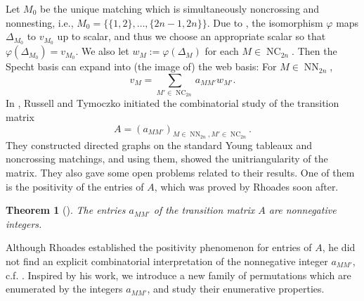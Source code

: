 \documentclass[reqno,12pt]{amsart}
\newtheorem{thm}{Theorem}[section]
\theoremstyle{definition}
\theoremstyle{remark}
\newcommand\NC{\operatorname{NC}}
\newcommand\NN{\operatorname{NN}}
\begin{document}
Let \( M_0 \) be the unique matching which is simultaneously noncrossing and
nonnesting, i.e., \( M_0 = \{ \{1,2\},\dots,\{2n-1,2n\} \} \).
Due to \cite{RT19}, the isomorphism \( \varphi \) maps \( \Delta_{M_0} \)
to \( v_{M_0} \) up to scalar, and thus we choose an appropriate scalar so that
\( \varphi(\Delta_{M_0}) = v_{M_0} \).
We also let \( w_M := \varphi(\Delta_M) \) for each \( M\in\NC_{2n} \).
Then the Specht basis can expand into (the image of) the web basis:
For \( M\in\NN_{2n} \),
\[
  v_M = \sum_{M'\in\NC_{2n}} a_{MM'} w_{M'}.
\]
In \cite{RT19}, Russell and Tymoczko initiated the combinatorial study of
the transition matrix
\[
  A = (a_{MM'})_{M\in\NN_{2n}, M'\in\NC_{2n}}.
\]
They constructed directed graphs on the standard
Young tableaux and noncrossing matchings, and using them,
showed the unitriangularity of the matrix.
They also gave some open problems related to their results.
One of them is the positivity of the entries of \( A \),
which was proved by Rhoades soon after.
\begin{thm}[\cite{Rho19}]
  The entries \( a_{MM'} \) of the transition matrix \( A \) are
  nonnegative integers.
\end{thm}
Although Rhoades established the positivity phenomenon for entries of \( A \),
he did not find an explicit combinatorial interpretation of the nonnegative integer \( a_{MM'} \), c.f. \cite[Problem 1.3]{Rho19}.
Inspired by his work, we introduce a new family of permutations which
are enumerated by the integers \( a_{MM'} \), and study their enumerative
properties.
\end{document}
